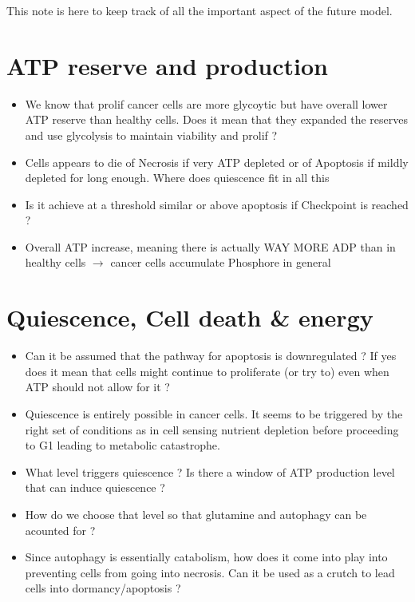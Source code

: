\documentclass[11pt,a4paper]{article}
\begin{document}
This note is here to keep track of all the important aspect of the future model.

\section{ATP reserve and production}
\begin{itemize}
\item We know that prolif cancer cells are more glycoytic but have overall lower ATP reserve than healthy cells. Does it mean that they expanded the reserves and use glycolysis to maintain viability and prolif ? 
\item Cells appears to die of Necrosis if very ATP depleted or of Apoptosis if mildly depleted for long enough.  Where does quiescence fit in all this 
\item Is it achieve at a threshold similar or above apoptosis if Checkpoint is reached ? 
\item Overall ATP increase, meaning there is actually WAY MORE ADP than in healthy cells $\rightarrow$ cancer cells accumulate Phosphore in general
\end{itemize}

\section{Quiescence, Cell death \& energy}
\begin{itemize}
\item Can it be assumed that the pathway for apoptosis is downregulated ? If yes does it mean that cells might continue to proliferate (or try to) even when ATP should not allow for it ?
\item Quiescence is entirely possible in cancer cells. It seems to be triggered by the right set of conditions as in cell sensing nutrient depletion before proceeding to G1 leading to metabolic catastrophe.
\item What level triggers quiescence ? Is there a window of ATP production level that can induce quiescence ?
\item How do we choose that level so that glutamine and autophagy can be acounted for ?
\item Since autophagy is essentially catabolism, how does it come into play into preventing cells from going into necrosis. Can it be used as a crutch to lead cells into dormancy/apoptosis ?

\end{itemize}
\end{document}

